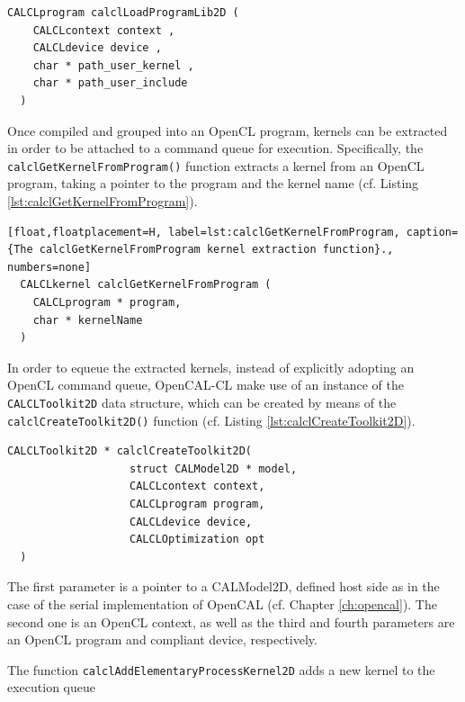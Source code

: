 \begin{lstlisting}[float,floatplacement=H, label=lst:calclLoadProgramLib, caption={The calclLoadProgramLib function. It loads and compiles kernels by returning an OpenCL program.}, numbers=none]
  CALCLprogram calclLoadProgramLib2D (
    CALCLcontext context ,
    CALCLdevice device ,
    char * path_user_kernel ,
    char * path_user_include
  )
\end{lstlisting}

Once compiled and grouped into an OpenCL program, kernels can be
extracted in order to be attached to a command queue for
execution. Specifically, the \verb'calclGetKernelFromProgram()'
function extracts a kernel from an OpenCL program, taking a pointer to
the program and the kernel name (cf. Listing
\ref{lst:calclGetKernelFromProgram}).

\begin{lstlisting}[float,floatplacement=H, label=lst:calclGetKernelFromProgram, caption={The calclGetKernelFromProgram kernel extraction function}., numbers=none]
  CALCLkernel calclGetKernelFromProgram (
    CALCLprogram * program,
    char * kernelName 
  )
\end{lstlisting}

In order to equeue the extracted kernels, instead of explicitly
adopting an OpenCL command queue, OpenCAL-CL make use of an instance of
the \verb'CALCLToolkit2D' data structure, which can be created by
means of the \verb'calclCreateToolkit2D()' function (cf. Listing
\ref{lst:calclCreateToolkit2D}). 

\begin{lstlisting}[float,floatplacement=H, label=lst:calclCreateToolkit2D, caption=The calclCreateToolkit2D data structure., numbers=none]
  CALCLToolkit2D * calclCreateToolkit2D(
                   struct CALModel2D * model,
                   CALCLcontext context,
                   CALCLprogram program,
                   CALCLdevice device,
                   CALCLOptimization opt
  )
\end{lstlisting}

The first parameter is a pointer to a CALModel2D, defined host side as
in the case of the serial implementation of OpenCAL (cf. Chapter
\ref{ch:opencal}). The second one is an OpenCL context, as well as the
third and fourth parameters are an OpenCL program and compliant
device, respectively.

The function \verb'calclAddElementaryProcessKernel2D' adds a new
kernel to the execution queue

